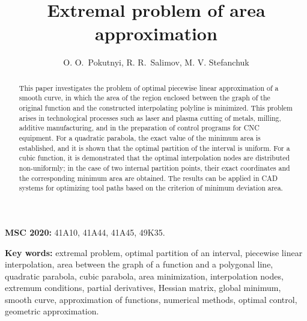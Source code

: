 \documentclass[amstex,16pt, amssymb]{article}
\theoremstyle{plain}
\theoremstyle{definition}
\numberwithin{equation}{section}
\numberwithin{equation}{section}
\begin{document}
\title{Extremal problem of area approximation}

\author{O. O.~Pokutnyi, R. R.~Salimov, M. V. Stefanchuk}




\date{}

\maketitle


\begin{abstract}
This paper investigates the problem of optimal piecewise li\-near approximation of a smooth curve, in which the area of the region enclosed between the graph of the original function and the constructed interpola\-ting polyline is minimized. This problem arises in technological processes such as laser and plasma cutting of metals, milling, additive manufactu\-ring, and in the preparation of control programs for CNC equipment. For a quadratic parabola, the exact value of the minimum area is established, and it is shown that the optimal partition of the interval is uniform. For a cubic function, it is demonstrated that the optimal interpolation nodes are distributed non-uniformly; in the case of two internal partition points, their exact coordinates and the corresponding minimum area are obtained. The results can be applied in CAD systems for optimizing tool paths based on the criterion of minimum deviation area.
\end{abstract}

\bigskip


{\bf MSC 2020:} {41A10, 41A44, 41A45, 49K35.}

\bigskip


{\bf Key words:} {extremal problem, optimal partition of an interval, piecewise linear interpolation, area between the graph of a function and a po\-ly\-go\-nal line, quadratic parabola, cubic parabola, area minimization, interpolation nodes, extremum conditions, partial derivatives, Hessian matrix, global minimum, smooth curve, approximation of functions, numerical methods, optimal control, geometric approximation.}


\end{document}
